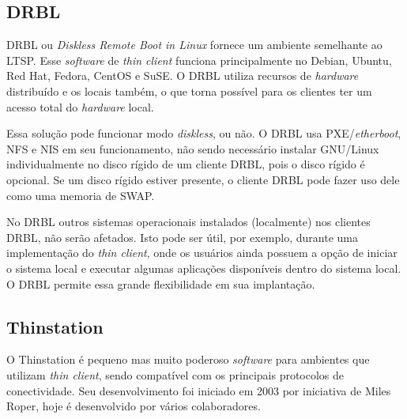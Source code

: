 \documentclass[
	12pt,				%
	openright,			%
	twoside,			%
	a4paper,			%
	chapter=TITLE,		%
	english,			%
	brazil				%
	]{abntex2}
\begin{document}
\subsection{DRBL}

DRBL ou \textit{Diskless Remote Boot in Linux} fornece um ambiente semelhante ao LTSP. Esse \textit{software} de \textit{thin client} funciona principalmente no Debian, Ubuntu, Red Hat, Fedora, CentOS e SuSE. O DRBL utiliza recursos de \textit{hardware} distribuído e os locais também, o que torna possível para os clientes ter um acesso total do \textit{hardware} local.\cite{drbl}

Essa solução pode funcionar modo \textit{diskless}, ou não. O DRBL usa PXE/\textit{etherboot}, NFS e NIS em seu funcionamento, não sendo necessário instalar GNU/Linux individualmente no disco rígido de um cliente DRBL, pois o disco rígido é opcional. Se um disco rígido estiver presente, o cliente DRBL pode fazer uso dele como uma memoria de SWAP.\cite{drbl,piaui,Frank.drbl}

No DRBL outros sistemas operacionais instalados (localmente) nos clientes DRBL, não serão afetados. Isto pode ser útil, por exemplo, durante uma implementação do \textit{thin client}, onde os usuários ainda possuem a opção de iniciar o sistema local e executar algumas aplicações disponíveis dentro do sistema local. O DRBL permite essa grande flexibilidade em sua implantação. \cite{drbl}







\subsection{Thinstation}

O Thinstation é pequeno mas muito poderoso \textit{software} para ambientes que utilizam \textit{thin client}, sendo compatível com os principais protocolos de conectividade. Seu desenvolvimento foi iniciado em 2003 por iniciativa de Miles Roper, hoje é desenvolvido por vários colaboradores.\cite{Thinstationl,piaui}
\end{document}
